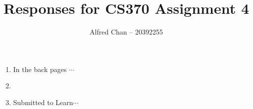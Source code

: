 \documentclass[12pt]{article}
\title{Responses for CS370 Assignment 4}
\author{Alfred Chan -- 20392255}
\begin{document}
\begin{enumerate}
\item In the back pages $\cdots$ \done
\item \done
\item Submitted to Learn$\cdots$ \done
\end{enumerate}
\end{document}
